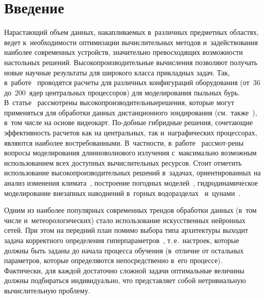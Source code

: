 \vspace*{-1pt}



\thispagestyle{headings}

\begin{multicols}{2}

\label{st\stat}

\section{Введение}

\vspace*{-6pt}

Нарастающий объем данных, накапливаемых в~различных предметных областях, 
ведет к~необходимости оптимизации вычислительных методов и~задействования 
наиболее современных устройств, значительно превосходящих возможности 
настольных решений. Высокопроизводительные вычисления позволяют получать 
новые научные результаты для широкого класса прикладных задач. 
Так, 
в~работе~\cite{Xie2010} проводятся расчеты для различных конфигураций оборудования 
(от~36 до~200~ядер центральных процессоров) для моделирования пыльных бурь. 
В~статье~\cite{Lee2011} рассмотрены высокопроизводительные\linebreak решения, которые 
могут применяться для обработки данных дистанционного зондирования (см.\
 также~\cite{Xue2011}), в~том числе на основе видеокарт. 
 По-\linebreak доб\-ные гибридные решения, сочетающие эффективность расчетов как на 
 центральных, так и~на\linebreak графических процессорах, являются наиболее 
 востребованными. В~частности, в~работе~\cite{Lu2012} рас\-смот-\linebreak рены вопросы 
 моделирования длинноволнового излучения с~максимально возможным использованием 
 всех доступных вычислительных ресурсов. Стоит отметить использование 
 высокопроизводительных решений в~задачах, ориентированных на анализ 
 изменения климата~\cite{Oubeidillah2014}, построение погодных 
 моделей~\cite{Thompson2017}, гидродинамическое моделирование внезапных 
 наводнений в~горных водоразделах~\cite{Hu2018} и~цунами~\cite{Reguly2018}.

Одним из наиболее популярных современных трендов обработки 
данных (в~том числе и~метеорологических) стало использование искусственных 
нейронных сетей. При этом на передний план помимо выбора типа архитектуры
 выходит задача корректного определения гиперпараметров~\cite{Zheng2019}, 
 т.\,е.\ настроек, которые должны быть заданы до начала процесса обучения 
 (в~отличие от остальных параметров, которые определяются непосредственно в~его 
 процессе). Фактически, для каждой достаточно сложной задачи оптимальные 
 величины должны подбираться индивидуально, что представляет собой нетривиальную 
 вычислительную проблему.


\end{multicols}
